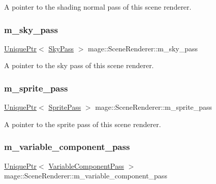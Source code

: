 A pointer to the shading normal pass of this scene renderer. \hypertarget{classmage_1_1_scene_renderer_ab41b737ea054ad6a3c3f29e61d8a2ae7}{}\label{classmage_1_1_scene_renderer_ab41b737ea054ad6a3c3f29e61d8a2ae7} 
\subsubsection{\texorpdfstring{m\+\_\+sky\+\_\+pass}{m\_sky\_pass}}
{\footnotesize\ttfamily \hyperlink{namespacemage_a3316d7143a973e37adf1110f2e80ca31}{Unique\+Ptr}$<$ \hyperlink{classmage_1_1_sky_pass}{Sky\+Pass} $>$ mage\+::\+Scene\+Renderer\+::m\+\_\+sky\+\_\+pass\hspace{0.3cm}{\ttfamily [private]}}

A pointer to the sky pass of this scene renderer. \hypertarget{classmage_1_1_scene_renderer_a39d0db7aa9275362cd460339143a089b}{}\label{classmage_1_1_scene_renderer_a39d0db7aa9275362cd460339143a089b} 
\subsubsection{\texorpdfstring{m\+\_\+sprite\+\_\+pass}{m\_sprite\_pass}}
{\footnotesize\ttfamily \hyperlink{namespacemage_a3316d7143a973e37adf1110f2e80ca31}{Unique\+Ptr}$<$ \hyperlink{classmage_1_1_sprite_pass}{Sprite\+Pass} $>$ mage\+::\+Scene\+Renderer\+::m\+\_\+sprite\+\_\+pass\hspace{0.3cm}{\ttfamily [private]}}

A pointer to the sprite pass of this scene renderer. \hypertarget{classmage_1_1_scene_renderer_af3544515e1792eb3b1c1e511b1bccf46}{}\label{classmage_1_1_scene_renderer_af3544515e1792eb3b1c1e511b1bccf46} 
\subsubsection{\texorpdfstring{m\+\_\+variable\+\_\+component\+\_\+pass}{m\_variable\_component\_pass}}
{\footnotesize\ttfamily \hyperlink{namespacemage_a3316d7143a973e37adf1110f2e80ca31}{Unique\+Ptr}$<$ \hyperlink{classmage_1_1_variable_component_pass}{Variable\+Component\+Pass} $>$ mage\+::\+Scene\+Renderer\+::m\+\_\+variable\+\_\+component\+\_\+pass\hspace{0.3cm}{\ttfamily [private]}}

